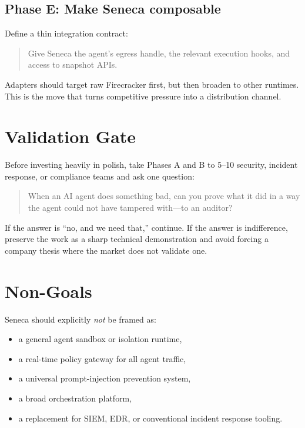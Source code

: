 \documentclass[11pt]{article}
\begin{document}
\subsection{Phase E: Make Seneca composable}

Define a thin integration contract:
\begin{quote}
Give Seneca the agent's egress handle, the relevant execution hooks, and access to snapshot APIs.
\end{quote}

Adapters should target raw Firecracker first, but then broaden to other runtimes. This is the move that turns competitive pressure into a distribution channel.

\section{Validation Gate}

Before investing heavily in polish, take Phases A and B to 5--10 security, incident response, or compliance teams and ask one question:

\begin{quote}
When an AI agent does something bad, can you prove what it did in a way the agent could not have tampered with---to an auditor?
\end{quote}

If the answer is ``no, and we need that,'' continue. If the answer is indifference, preserve the work as a sharp technical demonstration and avoid forcing a company thesis where the market does not validate one.

\section{Non-Goals}

Seneca should explicitly \emph{not} be framed as:

\begin{itemize}[leftmargin=1.5em]
    \item a general agent sandbox or isolation runtime,
    \item a real-time policy gateway for all agent traffic,
    \item a universal prompt-injection prevention system,
    \item a broad orchestration platform,
    \item a replacement for SIEM, EDR, or conventional incident response tooling.
\end{itemize}
\end{document}
